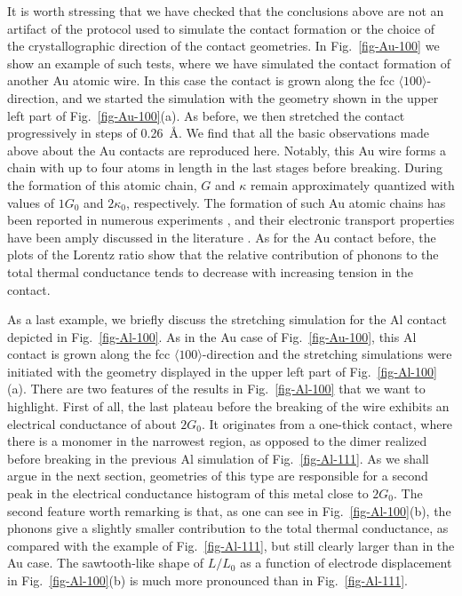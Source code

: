 \documentclass[aps,amsmath,amssymb,twocolumn,showpacs]{revtex4-1}
\begin{document}
It is worth stressing that we have checked that the conclusions above are not
an artifact of the protocol used to simulate the contact formation or the
choice of the crystallographic direction of the contact geometries. In
Fig.~\ref{fig-Au-100} we show an example of such tests, where we have
simulated the contact formation of another Au atomic wire. In this case the
contact is grown along the fcc $\langle 100 \rangle$-direction, and we started
the simulation with the geometry shown in the upper left part of
Fig.~\ref{fig-Au-100}(a). As before, we then stretched the contact
progressively in steps of 0.26~\AA. We find that all the
basic observations made above about the Au contacts are reproduced
here. Notably, this Au wire forms a chain with up to four atoms in length in
the last stages before breaking. During the formation of this atomic chain,
$G$ and $\kappa$ remain approximately quantized with values of $1G_0$ and
$2\kappa_0$, respectively. The formation of such Au atomic chains has been
reported in numerous experiments
\cite{Smit2003,Yanson1998,Ohnishi1998,Rodrigues2000}, and their electronic
transport properties have been amply discussed in the literature
\cite{Agrait2003,Cuevas2017}. As for the Au contact before, the plots of the
Lorentz ratio show that the relative contribution of phonons to the total
thermal conductance tends to decrease with increasing tension in the contact.

As a last example, we briefly discuss the stretching simulation for the Al
contact depicted in Fig.~\ref{fig-Al-100}. As in the Au case of
Fig.~\ref{fig-Au-100}, this Al contact is grown along the fcc $\langle 100
\rangle$-direction and the stretching simulations were initiated with the
geometry displayed in the upper left part of Fig.~\ref{fig-Al-100}(a). There
are two features of the results in Fig.~\ref{fig-Al-100} that we want to
highlight. First of all, the last plateau before the breaking of the wire
exhibits an electrical conductance of about $2G_0$. It originates from a
one-thick contact, where there is a monomer in the narrowest region,
as opposed to the dimer realized before breaking in the
previous Al simulation of Fig.~\ref{fig-Al-111}. As we shall argue in the
next section, geometries of this type are responsible for a second peak in the
electrical conductance histogram of this metal close to $2G_0$. The second
feature worth remarking is that, as one can see in Fig.~\ref{fig-Al-100}(b),
the phonons give a slightly smaller contribution to the total thermal
conductance, as compared with the example of Fig.~\ref{fig-Al-111}, but still
clearly larger than in the Au case. The sawtooth-like shape of $L/L_0$ as a
function of electrode displacement in Fig.~\ref{fig-Al-100}(b) is much more
pronounced than in Fig.~\ref{fig-Al-111}.
\end{document}
